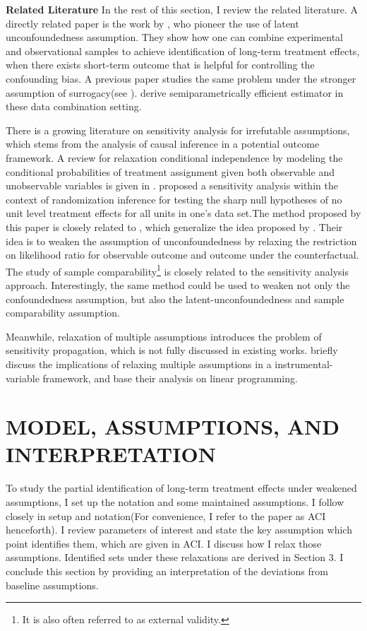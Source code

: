 \documentclass[12pt]{article}
\begin{document}
	\medskip
	\textbf{Related Literature} In the rest of this section, I review the related literature. A directly related paper is the work by \textcite{athey2020combining}, who pioneer the use of latent unconfoundedness assumption. They show how one can combine experimental and observational samples to achieve identification of long-term treatment effects, when there exists short-term outcome that is helpful for controlling the confounding bias. A previous paper studies the same problem under the stronger assumption of surrogacy(see \textcite{athey2019surrogate}). \textcite{chen2021semiparametric} derive semiparametrically efficient estimator in these data combination setting. 

    There is a growing literature on sensitivity analysis for irrefutable assumptions, which stems from the analysis of causal inference in a potential outcome framework. A review for relaxation conditional independence by modeling the conditional probabilities of treatment assignment given both observable and unobservable variables is given in \textcite{masten2018identification}. \textcite{rosenbaum2002overt} proposed a sensitivity analysis within the context of randomization inference for testing the sharp null hypotheses of no unit level treatment effects for all units in one’s data set.The method proposed by this paper is closely related to \textcite{yadlowsky2018bounds}, which generalize the idea proposed by \textcite{rosenbaum2002overt}. Their idea is to weaken the assumption of unconfoundedness by relaxing the restriction on likelihood ratio for observable outcome and outcome under the counterfactual. The study of sample comparability\footnote{It is also often referred to as external validity.} is closely related to the sensitivity analysis approach. 
    Interestingly, the same method could be used to weaken not only the confoundedness assumption, but also the latent-unconfoundedness and sample comparability assumption. 

    Meanwhile, relaxation of multiple assumptions introduces the problem of sensitivity propagation, which is not fully discussed in existing works. \textcite{masten2021salvaging} briefly discuss the implications of relaxing multiple assumptions in a instrumental-variable framework, and base their analysis on linear programming. 

	\section{MODEL, ASSUMPTIONS, AND INTERPRETATION}
    To study the partial identification of long-term treatment effects under weakened assumptions, I set up the notation and some maintained assumptions. I follow \textcite{athey2020combining} closely in setup and notation(For convenience, I refer to the paper as ACI henceforth). I review parameters of
interest and state the key assumption which point identifies them, which are given in ACI. I discuss how I relax those assumptions. Identified sets under these relaxations are derived in Section 3. I conclude this section by providing an interpretation of the deviations from baseline assumptions.
	
\end{document}
